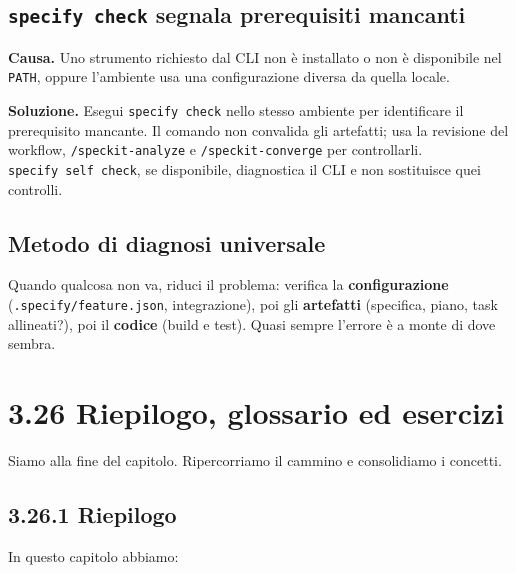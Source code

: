 \documentclass[
  italian,
  10pt,
]{book}
\begin{document}
\subsection{\texorpdfstring{\texttt{specify\ check} segnala prerequisiti
mancanti}{specify check segnala prerequisiti mancanti}}\label{specify-check-segnala-prerequisiti-mancanti}

\textbf{Causa.} Uno strumento richiesto dal CLI non è installato o non è
disponibile nel \texttt{PATH}, oppure l'ambiente usa una configurazione
diversa da quella locale.

\textbf{Soluzione.} Esegui \texttt{specify\ check} nello stesso ambiente
per identificare il prerequisito mancante. Il comando non convalida gli
artefatti; usa la revisione del workflow, \texttt{/speckit-analyze} e
\texttt{/speckit-converge} per controllarli.
\texttt{specify\ self\ check}, se disponibile, diagnostica il CLI e non
sostituisce quei controlli.

\subsection{Metodo di diagnosi
universale}\label{metodo-di-diagnosi-universale}

Quando qualcosa non va, riduci il problema: verifica la
\textbf{configurazione} (\texttt{.specify/feature.json}, integrazione),
poi gli \textbf{artefatti} (specifica, piano, task allineati?), poi il
\textbf{codice} (build e test). Quasi sempre l'errore è a monte di dove
sembra.

\section{3.26 Riepilogo, glossario ed
esercizi}\label{riepilogo-glossario-ed-esercizi}

Siamo alla fine del capitolo. Ripercorriamo il cammino e consolidiamo i
concetti.

\subsection{3.26.1 Riepilogo}\label{riepilogo}

In questo capitolo abbiamo:
\end{document}
